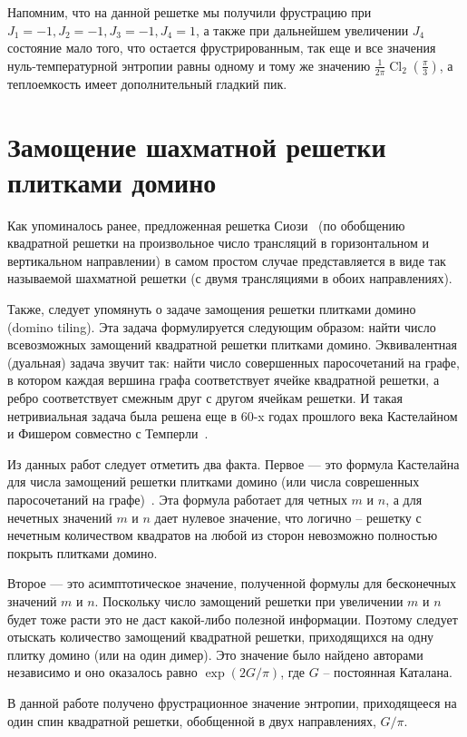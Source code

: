 \documentclass[utf8,12pt]{jetp}
\DeclareMathOperator{\Cl}{Cl}
\begin{document}
Напомним, что на данной решетке мы получили фрустрацию при $J_1 = -1, J_2 =-1, J_3 = -1, J_4 = 1$, а также при дальнейшем увеличении $J_4$ состояние мало того, что остается фрустрированным, так еще и все значения нуль-температурной энтропии равны одному и тому же значению $\frac{1}{2\pi} \Cl_2 (\frac{\pi}{3})$, а теплоемкость имеет дополнительный гладкий пик.

\section{Замощение шахматной решетки плитками домино}

Как упоминалось ранее, предложенная решетка Сиози~\cite{generalizedIsing2021} (по обобщению квадратной решетки на произвольное число трансляций в горизонтальном и вертикальном направлении) в самом простом случае представляется в виде так называемой шахматной решетки (с двумя трансляциями в обоих направлениях). 

Также, следует упомянуть о задаче замощения решетки плитками домино (domino tiling). Эта задача формулируется следующим образом: найти число всевозможных замощений квадратной решетки плитками домино. Эквивалентная (дуальная) задача звучит так: найти число совершенных паросочетаний на графе, в котором каждая вершина графа соответствует ячейке квадратной решетки, а ребро соответствует смежным друг с другом ячейкам решетки. И такая нетривиальная задача была решена еще в 60-x годах прошлого века Кастелайном~\cite{kasteleyn1961} и Фишером совместно с Темперли~\cite{temperley1961}.

Из данных работ следует отметить два факта. Первое --- это формула Кастелайна для числа замощений решетки плитками домино (или числа соврешенных паросочетаний на графе)~\cite{kasteleyn1961}. Эта формула работает для четных $m$ и $n$, а для нечетных значений $m$ и $n$ дает нулевое значение, что логично -- решетку с нечетным количеством квадратов на любой из сторон невозможно полностью покрыть плитками домино. 

Второе --- это асимптотическое значение, полученной формулы для бесконечных значений $m$ и $n$. Поскольку число замощений решетки при увеличении $m$ и $n$ будет тоже расти это не даст какой-либо полезной информации. Поэтому следует отыскать количество замощений квадратной решетки, приходящихся на одну плитку домино (или на один димер). Это значение было найдено авторами независимо и оно оказалось равно $\exp{(2G/\pi)}$, где $G$ -- постоянная Каталана.

В данной работе получено фрустрационное значение энтропии, приходящееся на один спин квадратной решетки, обобщенной в двух направлениях, $G/\pi$. 
\end{document}
